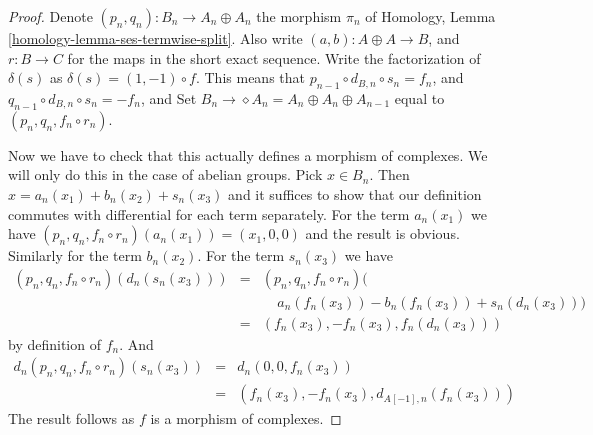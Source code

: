\documentclass{stacks-project}
\theoremstyle{plain}
\theoremstyle{definition}
\theoremstyle{remark}
\numberwithin{equation}{subsection}
\begin{document}
\begin{proof}
Denote $(p_n, q_n) : B_n \to A_n \oplus A_n$ the morphism $\pi_n$
of Homology, Lemma \ref{homology-lemma-ses-termwise-split}.
Also write $(a, b) : A \oplus A \to B$, and
$r : B \to C$ for the maps in the short exact sequence.
Write the factorization of $\delta(s)$ as
$\delta(s) = (1, -1) \circ f$. This means that
$p_{n - 1} \circ d_{B, n} \circ s_n = f_n$, and
$q_{n - 1} \circ d_{B, n} \circ s_n = - f_n$, and
Set $B_n \to \diamond A_n = A_n \oplus A_n \oplus A_{n - 1}$
equal to $(p_n, q_n, f_n \circ r_n)$.

\medskip\noindent
Now we have to check that this actually defines a morphism
of complexes. We will only do this in the case of abelian groups.
Pick $x \in B_n$. Then $x = a_n(x_1) + b_n(x_2) + s_n(x_3)$
and it suffices to show that our definition commutes
with differential for each term separately. For the term
$a_n(x_1)$ we have $(p_n, q_n, f_n \circ r_n)(a_n(x_1)) =
(x_1, 0, 0)$ and the result is obvious. Similarly for
the term $b_n(x_2)$. For the term $s_n(x_3)$ we have
\begin{eqnarray*}
(p_n, q_n, f_n \circ r_n)(d_n(s_n(x_3))) & = &
(p_n, q_n, f_n \circ r_n)( \\
& & \ \ \ \ \ a_n(f_n(x_3)) - b_n(f_n(x_3)) + s_n(d_n(x_3))) \\
& = &
(f_n(x_3), -f_n(x_3), f_n(d_n(x_3)))
\end{eqnarray*}
by definition of $f_n$. And
\begin{eqnarray*}
d_n(p_n, q_n, f_n \circ r_n)(s_n(x_3)) & = & d_n(0, 0, f_n(x_3)) \\
& = &
(f_n(x_3), - f_n(x_3), d_{A[-1], n}(f_n(x_3)))
\end{eqnarray*}
The result follows as $f$ is a morphism of complexes.
\end{proof}
\end{document}

